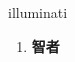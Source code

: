 
\begin{frame}
{\huge illuminati}
\begin{center}
\begin{enumerate}\Large
  \item \textbf{智者}
\end{enumerate}
\end{center}
\end{frame}
